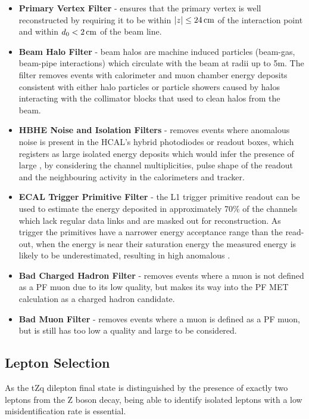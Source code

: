 \begin{itemize}
\item \textbf{Primary Vertex Filter} - ensures that the primary vertex is well reconstructed by requiring it to be within $|z| \leq 24\,\text{cm}$ of the interaction point and within $d_{0} < 2\,\text{cm}$ of the beam line.
\item \textbf{Beam Halo Filter} - beam halos are machine induced particles (\eg beam-gas, beam-pipe interactions) which circulate with the beam at radii up to 5m. The filter removes events with calorimeter and muon chamber energy deposits consistent with either halo particles or particle showers caused by halos interacting with the collimator blocks that used to clean halos from the beam.
\item \textbf{HBHE Noise and Isolation Filters} - removes events where anomalous noise is present in the HCAL's hybrid photodiodes or readout boxes, which registers as large isolated energy deposits which would infer the presence of large \MET, by considering the channel multiplicities, pulse shape of the readout and the neighbouring activity in the calorimeters and tracker.
\item \textbf{ECAL Trigger Primitive Filter} - the L1 trigger primitive readout can be used to estimate the energy deposited in approximately 70\% of the channels which lack regular data links and are masked out for reconstruction. As trigger the primitives have a narrower energy acceptance range than the read-out, when the energy is near their saturation energy the measured energy is likely to be underestimated, resulting in high anomalous \MET. 
\item \textbf{Bad Charged Hadron Filter} - removes events where a muon is not defined as a PF muon due to its low quality, but makes its way into the PF MET calculation as a charged hadron candidate.
\item \textbf{Bad Muon Filter} - removes events where a muon is defined as a PF muon, but is still has too low a quality and large \pT to be considered.
\end{itemize}

\subsection{Lepton Selection}
As the tZq dilepton final state is distinguished by the presence of exactly two leptons from the Z boson decay, being able to identify isolated leptons with a low misidentification rate is essential.


